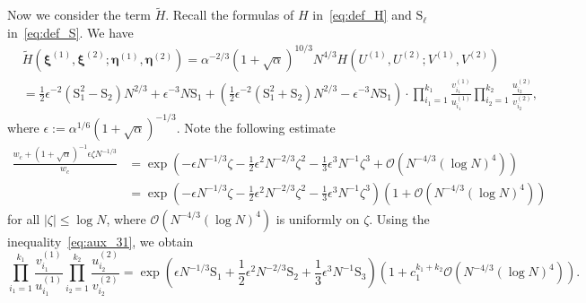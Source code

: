 \documentclass{article}
\numberwithin{equation}{section}
\newcommand{\bigO}{\mathcal{O}}
\begin{document}
Now we consider the term $\tilde H$. Recall the formulas of $H$ in~\eqref{eq:def_H} and $\mathrm{S}_\ell$ in~\eqref{eq:def_S}. We have
\begin{equation}
	\label{eq:aux_20}\begin{split}
		&\tilde {H}(\boldsymbol{\xi}^{(1)},\boldsymbol{\xi}^{(2)};
		\boldsymbol{\eta}^{(1)},\boldsymbol{\eta}^{(2)})=\alpha^{-2/3}(1+\sqrt{\alpha})^{10/3}N^{4/3}H(U^{(1)},U^{(2)};V^{(1)},V^{(2)})\\
	 &=\frac{1}{2}\epsilon^{-2}\left(\mathrm{S}_1^2-\mathrm{S}_2\right) N^{2/3}+\epsilon^{-3}N \mathrm{S}_1 +\left(\frac{1}{2}\epsilon^{-2}(\mathrm{S}_1^2+\mathrm{S}_2) N^{2/3}-\epsilon^{-3}N \mathrm{S}_1\right)\cdot \prod_{i_1=1}^{k_1}\frac{v_{i_1}^{(1)}}{u_{i_1}^{(1)}}\prod_{i_2=1}^{k_2}\frac{u_{i_2}^{(2)}}{v_{i_2}^{(2)}},
	\end{split}
\end{equation}
where  $\epsilon :=\alpha^{1/6}(1+\sqrt{\alpha})^{-1/3}$. Note the following estimate
\begin{equation*}
	\begin{split}
	\frac{w_c+(1+\sqrt{\alpha})^{-1}\epsilon \zeta N^{-1/3}}{w_c} &= \exp\left(-\epsilon N^{-1/3}\zeta -\frac{1}{2}\epsilon^2N^{-2/3}\zeta^2 -\frac{1}{3}\epsilon^3N^{-1}\zeta^3 +\bigO(N^{-4/3}(\log N)^4)\right)\\
	&=\exp\left(-\epsilon N^{-1/3}\zeta -\frac{1}{2}\epsilon^2N^{-2/3}\zeta^2 -\frac{1}{3}\epsilon^3N^{-1}\zeta^3 \right)\left(1+\bigO(N^{-4/3}(\log N)^4)\right)
	\end{split}
\end{equation*}
for all $|\zeta|\le \log N$, where $\bigO(N^{-4/3}(\log N)^4)$ is uniformly on $\zeta$. Using the inequality~\eqref{eq:aux_31}, we obtain
\begin{equation}
	\label{eq:aux_32}
	\prod_{i_1=1}^{k_1}\frac{v_{i_1}^{(1)}}{u_{i_1}^{(1)}}\prod_{i_2=1}^{k_2}\frac{u_{i_2}^{(2)}}{v_{i_2}^{(2)}}=\exp\left(\epsilon N^{-1/3}\mathrm{S}_1+\frac12\epsilon^2 N^{-2/3} \mathrm{S}_2 +\frac{1}{3}\epsilon^3N^{-1}\mathrm{S}_3\right)\left(1+c_1^{k_1+k_2} \bigO(N^{-4/3}(\log N)^4)\right).
\end{equation}
\end{document}
